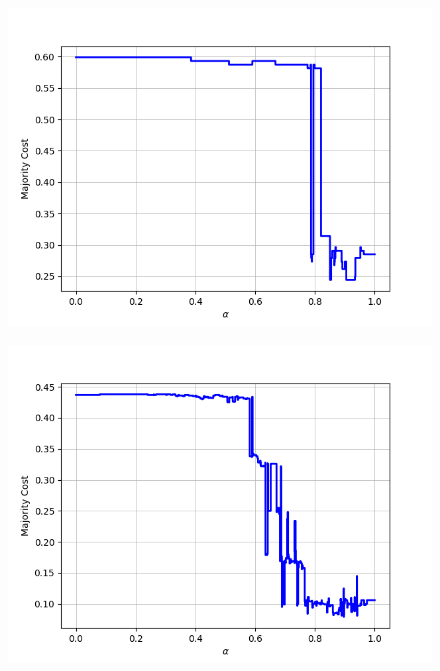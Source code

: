 \begin{figure}[h]
\begin{minipage}{.24\textwidth}
  {\includegraphics[width=\linewidth]{plots/nell-sc/mediacompany}}
\end{minipage}
\begin{minipage}{.24\textwidth}
  \centering
  {\includegraphics[width=\linewidth]{plots/nell-sc/organization}}
\end{minipage}
\begin{minipage}{.24\textwidth}
  \centering

\end{minipage}
\end{figure}
